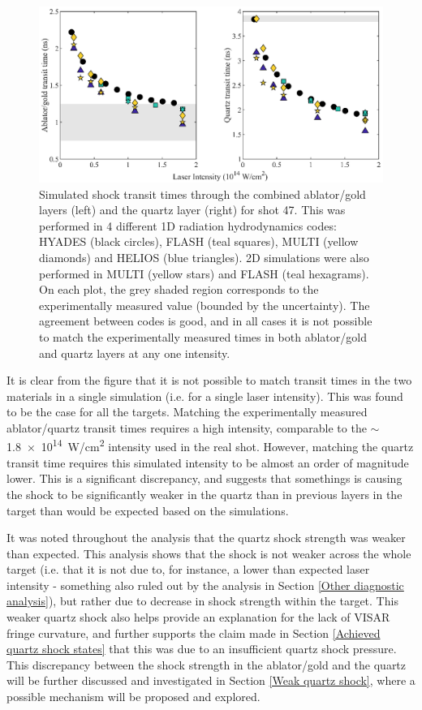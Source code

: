 \begin{figure} [h!]
\begin{centering}
\includegraphics{figures/Experiment/SimulationVertical_edit.eps}%
\caption{\label{fig:SimulationPlot} Simulated shock transit times through the combined ablator/gold layers (left) and the quartz layer (right) for shot 47. This was performed in 4 different 1D radiation hydrodynamics codes: HYADES (black circles), FLASH (teal squares), MULTI (yellow diamonds) and HELIOS (blue triangles). 2D simulations were also performed in MULTI (yellow stars) and FLASH (teal hexagrams). On each plot, the grey shaded region corresponds to the experimentally measured value (bounded by the uncertainty). The agreement between codes is good, and in all cases it is not possible to match the experimentally measured times in both ablator/gold and quartz layers at any one intensity.}
\end{centering}
\end{figure}

It is clear from the figure that it is not possible to match transit times in the two materials in a single simulation (i.e. for a single laser intensity). This was found to be the case for all the targets. Matching the experimentally measured ablator/quartz transit times requires a high intensity, comparable to the $\sim$\num{1.8e14}~\si[per-mode=symbol]{W/cm^2} intensity used in the real shot. However, matching the quartz transit time requires this simulated intensity to be almost an order of magnitude lower. This is a significant discrepancy, and suggests that somethings is causing the shock to be significantly weaker in the quartz than in previous layers in the target than would be expected based on the simulations. 

It was noted throughout the analysis that the quartz shock strength was weaker than expected. This analysis shows that the shock is not weaker across the whole target (i.e. that it is not due to, for instance, a lower than expected laser intensity - something also ruled out by the analysis in Section \ref{Other diagnostic analysis}), but rather due to decrease in shock strength within the target. This weaker quartz shock also helps provide an explanation for the lack of VISAR fringe curvature, and further supports the claim made in Section \ref{Achieved quartz shock states} that this was due to an insufficient quartz shock pressure. This discrepancy between the shock strength in the ablator/gold and the quartz will be further discussed and investigated in Section \ref{Weak quartz shock}, where a possible mechanism will be proposed and explored.

